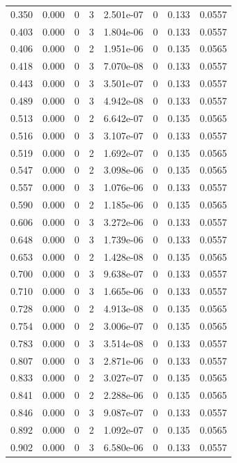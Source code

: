\documentclass[preview]{standalone}
\begin{document}
{{\begin{tabular}{L{1.2cm}C{1.2cm} C{0.3cm}C{0.5cm} C{1.4cm}C{1.4cm} C{1.4cm}C{1.4cm}}
  0.350  &  0.000  & 0     &  3 &  2.501e-07  & 0  & 0.133 &  0.0557   \\ 
  0.403  &  0.000  & 0     &  3 &  1.804e-06  & 0  & 0.133 &  0.0557   \\ 
  0.406  &  0.000  & 0     &  2 &  1.951e-06  & 0  & 0.135 &  0.0565   \\ 
  0.418  &  0.000  & 0     &  3 &  7.070e-08  & 0  & 0.133 &  0.0557   \\ 
  0.443  &  0.000  & 0     &  3 &  3.501e-07  & 0  & 0.133 &  0.0557   \\ 
  0.489  &  0.000  & 0     &  3 &  4.942e-08  & 0  & 0.133 &  0.0557   \\ 
  0.513  &  0.000  & 0     &  2 &  6.642e-07  & 0  & 0.135 &  0.0565   \\ 
  0.516  &  0.000  & 0     &  3 &  3.107e-07  & 0  & 0.133 &  0.0557   \\ 
  0.519  &  0.000  & 0     &  2 &  1.692e-07  & 0  & 0.135 &  0.0565   \\ 
  0.547  &  0.000  & 0     &  2 &  3.098e-06  & 0  & 0.135 &  0.0565   \\ 
  0.557  &  0.000  & 0     &  3 &  1.076e-06  & 0  & 0.133 &  0.0557   \\ 
  0.590  &  0.000  & 0     &  2 &  1.185e-06  & 0  & 0.135 &  0.0565   \\ 
  0.606  &  0.000  & 0     &  3 &  3.272e-06  & 0  & 0.133 &  0.0557   \\ 
  0.648  &  0.000  & 0     &  3 &  1.739e-06  & 0  & 0.133 &  0.0557   \\ 
  0.653  &  0.000  & 0     &  2 &  1.428e-08  & 0  & 0.135 &  0.0565   \\ 
  0.700  &  0.000  & 0     &  3 &  9.638e-07  & 0  & 0.133 &  0.0557   \\ 
  0.710  &  0.000  & 0     &  3 &  1.665e-06  & 0  & 0.133 &  0.0557   \\ 
  0.728  &  0.000  & 0     &  2 &  4.913e-08  & 0  & 0.135 &  0.0565   \\ 
  0.754  &  0.000  & 0     &  2 &  3.006e-07  & 0  & 0.135 &  0.0565   \\ 
  0.783  &  0.000  & 0     &  3 &  3.514e-08  & 0  & 0.133 &  0.0557   \\ 
  0.807  &  0.000  & 0     &  3 &  2.871e-06  & 0  & 0.133 &  0.0557   \\ 
  0.833  &  0.000  & 0     &  2 &  3.027e-07  & 0  & 0.135 &  0.0565   \\ 
  0.841  &  0.000  & 0     &  2 &  2.288e-06  & 0  & 0.135 &  0.0565   \\ 
  0.846  &  0.000  & 0     &  3 &  9.087e-07  & 0  & 0.133 &  0.0557   \\ 
  0.892  &  0.000  & 0     &  2 &  1.092e-07  & 0  & 0.135 &  0.0565   \\ 
  0.902  &  0.000  & 0     &  3 &  6.580e-06  & 0  & 0.133 &  0.0557   \\ 
\hline 
\end{tabular} 

}}
\end{document}
